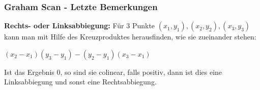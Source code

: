 \begin{frame}
	\frametitle{{Graham Scan - Letzte Bemerkungen}}
\textbf{Rechts- oder Linksabbiegung:}
Für 3 Punkte $(x_1, y_1), (x_2, y_2), (x_3, y_3)$ kann man mit Hilfe des Kreuzproduktes herausfinden, wie sie zueinander stehen:
\begin{center}
$(x_2-x_1)(y_3-y_1)-(y_2-y_1)(x_3-x_1)$
\end{center}
Ist das Ergebnis 0, so sind sie colinear, falls positiv, dann ist dies eine Linksabbiegung und sonst eine Rechtsabbiegung.
\end{frame}
